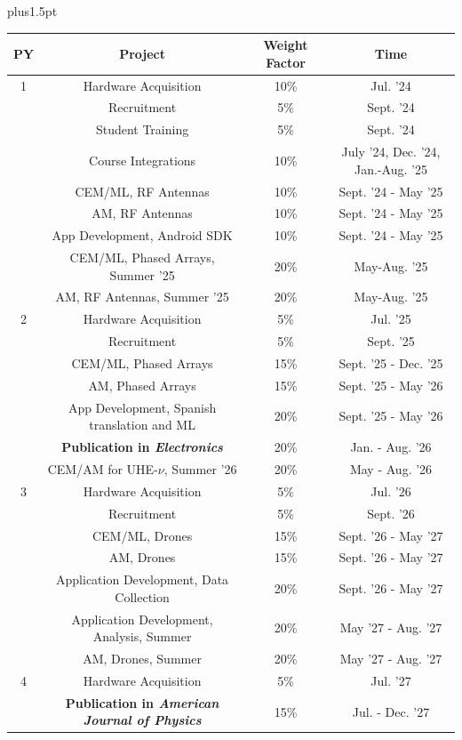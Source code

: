 \documentclass[10pt]{amsart}
\renewcommand{\footnotesize}{\small\spaceskip4pt plus1.5pt}
\theoremstyle{definition}
\numberwithin{equation}{section}
\begin{document}
\begin{table}[ht]
\footnotesize
\centering
\begin{tabular}{c | c | c | c}
PY & Project & Weight Factor & Time \\ \hline
1 & Hardware Acquisition & 10\% & Jul. '24 \\
 & Recruitment & 5\% & Sept. '24 \\ 
 & Student Training & 5\% & Sept. '24 \\
 & Course Integrations & 10\% & July '24, Dec. '24, Jan.-Aug. '25 \\
 & CEM/ML, RF Antennas & 10\% & Sept. '24 - May '25 \\
 & AM, RF Antennas & 10\% & Sept. '24 - May '25 \\
 & App Development, Android SDK & 10\% & Sept. '24 - May '25 \\
 & CEM/ML, Phased Arrays, Summer '25 & 20\% & May-Aug. '25 \\
 & AM, RF Antennas, Summer '25 & 20\% & May-Aug. '25 \\
\hline
2 & Hardware Acquisition & 5\% & Jul. '25 \\ 
 & Recruitment & 5\% & Sept. '25 \\
 & CEM/ML, Phased Arrays & 15\% & Sept. '25 - Dec. '25 \\
 & AM, Phased Arrays & 15\% & Sept. '25 - May '26 \\
 & App Development, Spanish translation and ML & 20\% & Sept. '25 - May '26 \\
 & \textbf{Publication in \textit{Electronics}} & 20\% & Jan. - Aug. '26 \\
 & CEM/AM for UHE-$\nu$, Summer '26 & 20\% & May - Aug. '26 \\
\hline
3 & Hardware Acquisition & 5\% & Jul. '26 \\
 & Recruitment & 5\% & Sept. '26 \\
 & CEM/ML, Drones & 15\% & Sept. '26 - May '27 \\
 & AM, Drones & 15\% & Sept. '26 - May '27 \\
 & Application Development, Data Collection & 20\% & Sept. '26 - May '27 \\
 & Application Development, Analysis, Summer & 20\% & May '27 - Aug. '27 \\
 & AM, Drones, Summer & 20\% & May '27 - Aug. '27 \\
\hline
4 & Hardware Acquisition & 5\% & Jul. '27 \\
 & \textbf{Publication in \textit{American Journal of Physics}} & 15\% & Jul. - Dec. '27 \\

\end{tabular}
\end{table}
\end{document}
